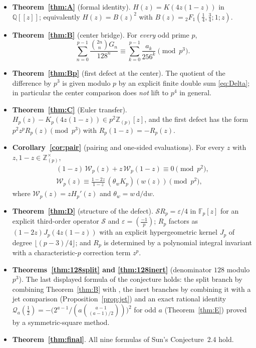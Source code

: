 \documentclass[11pt]{amsart}
\theoremstyle{definition}
\theoremstyle{remark}
\newcommand{\dd}{\mathrm{d}}
\newcommand{\Fp}{\mathbb{F}_p}
\newcommand{\Q}{\mathbb{Q}}
\newcommand{\Zp}{\mathbb{Z}_{(p)}}
\newcommand{\leg}[2]{\left(\frac{#1}{#2}\right)}
\begin{document}
\begin{itemize}
\item \textbf{Theorem~\ref{thm:A}} (formal identity).
$H(z)=K(4z(1-z))$ in $\Q[[z]]$; equivalently $H(z)=B(z)^2$ with
$B(z)={}_2F_1(\frac14,\frac34;1;z)$.

\item \textbf{Theorem~\ref{thm:B}} (center bridge). For \emph{every} odd
prime $p$,
\[
\sum_{n=0}^{p-1}\frac{\binom{2n}{n}G_n}{128^n}
\equiv\sum_{k=0}^{p-1}\frac{a_k}{256^k}\pmod{p^3}.
\]

\item \textbf{Theorem~\ref{thm:Bp}} (first defect at the center). The
quotient of the difference by $p^3$ is given modulo $p$ by an explicit
finite double sum \eqref{eq:Delta}; in particular the center comparison
does \emph{not} lift to $p^4$ in general.

\item \textbf{Theorem~\ref{thm:C}} (Euler transfer).
$H_p(z)-K_p(4z(1-z))\in p^2\Zp[z]$, and the first defect has the form
$p^2z^pR_p(z)\pmod{p^3}$ with $R_p(1-z)=-R_p(z)$.

\item \textbf{Corollary~\ref{cor:pair}} (pairing and one-sided
evaluations). For every $z$ with $z,1-z\in\Zp^\times$,
\begin{gather*}
(1-z)\,\mathcal W_p(z)+z\,\mathcal W_p(1-z)\equiv0\pmod{p^2},\\
\mathcal W_p(z)\equiv\frac{1-2z}{1-z}\,(\theta_wK_p)(w(z))\pmod{p^2},
\end{gather*}
where $\mathcal W_p(z)=zH_p'(z)$ and $\theta_w=w\,\dd/\dd w$.

\item \textbf{Theorem~\ref{thm:D}} (structure of the defect).
$\mathcal SR_p=\varepsilon/4$ in $\Fp[z]$ for an explicit third-order
operator $\mathcal S$ and $\varepsilon=\leg{-1}{p}$; $R_p$ factors as
$(1-2z)J_p(4z(1-z))$ with an explicit hypergeometric kernel $J_p$ of
degree $\lfloor(p-3)/4\rfloor$; and $R_p$ is determined by a polynomial
integral invariant with a characteristic-$p$ correction term $z^p$.

\item \textbf{Theorems~\ref{thm:128split} and \ref{thm:128inert}}
(denominator $128$ modulo $p^3$).
The last displayed formula of the conjecture holds: the split branch by
combining Theorem~\ref{thm:B} with \cite[Theorem~1.5]{SunYe}, the inert
branches by combining it with a jet comparison
(Proposition~\ref{prop:jet}) and an exact rational identity
$\mathcal Q_a(\tfrac12)=-\bigl(2^{a-1}/(a\binom{a-1}{(a-1)/2})\bigr)^2$
for odd $a$ (Theorem~\ref{thm:E}) proved by a symmetric-square method.

\item \textbf{Theorem~\ref{thm:final}}. All nine formulas of Sun's
Conjecture~2.4 hold.
\end{itemize}
\end{document}
